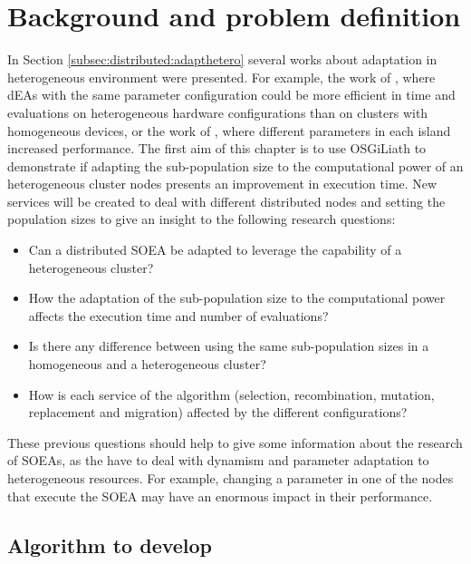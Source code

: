 \section{Background and problem definition}
In Section \ref{subsec:distributed:adapthetero} several works about adaptation in heterogeneous environment were presented. For example, the work of , where dEAs with the same parameter configuration could be more efficient in time and evaluations on heterogeneous hardware configurations than on clusters with homogeneous devices, or the work of , where different parameters in each island increased performance. The first aim of this chapter is to use OSGiLiath to demonstrate if adapting the sub-population size to the computational power of an heterogeneous cluster nodes presents an improvement in execution time. New services will be created to deal with different distributed nodes and setting the population sizes to give an insight to the following research questions:
\begin{itemize}
 \item Can a distributed SOEA be adapted to leverage the capability of a
   heterogeneous cluster?  %
 \item How the adaptation of the sub-population size to the
   computational power affects the execution time and number of
   evaluations?  %
 \item Is there any difference between using the same sub\--po\-pu\-la\-tion sizes in a homogeneous and a heterogeneous cluster?
 \item How is each service of the algorithm (selection, recombination, mutation, replacement and migration) affected by the different
   configurations?  %
\end{itemize}

These previous questions should help to give some information about the research of SOEAs, as the have to deal with dynamism and parameter adaptation to heterogeneous resources. For example, changing a parameter in one of the nodes that execute the SOEA may have an enormous impact in their performance.







\subsection{Algorithm to develop}

